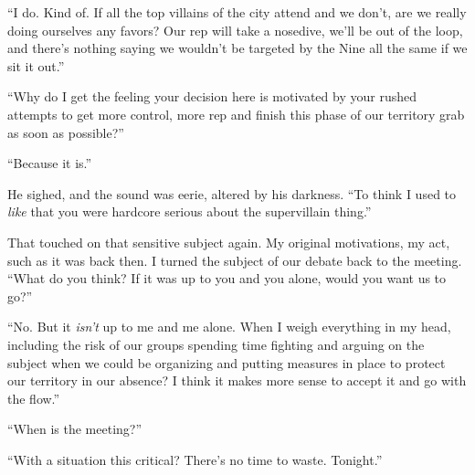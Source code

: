 ``I do.  Kind of.  If all the top villains of the city attend and we don't, are we really doing ourselves any favors?  Our rep will take a nosedive, we'll be out of the loop, and there's nothing saying we wouldn't be targeted by the Nine all the same if we sit it out.''



``Why do I get the feeling your decision here is motivated by your rushed attempts to get more control, more rep and finish this phase of our territory grab as soon as possible?''



``Because it is.''



He sighed, and the sound was eerie, altered by his darkness.  ``To think I used to \emph{like} that you were hardcore serious about the supervillain thing.''



That touched on that sensitive subject again.  My original motivations, my act, such as it was back then.  I turned the subject of our debate back to the meeting.  ``What do you think?  If it was up to you and you alone, would you want us to go?''



``No.  But it \emph{isn't} up to me and me alone.  When I weigh everything in my head, including the risk of our groups spending time fighting and arguing on the subject when we could be organizing and putting measures in place to protect our territory in our absence?  I think it makes more sense to accept it and go with the flow.''



``When is the meeting?''



``With a situation this critical?  There's no time to waste.  Tonight.''





